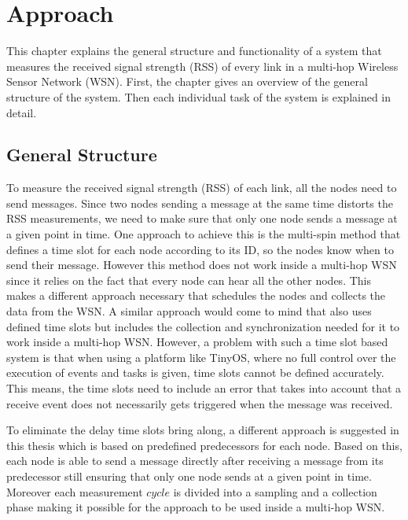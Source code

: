 \chapter{Approach}
\label{chp:apr}
This chapter explains the general structure and functionality of a system that measures the received signal strength (RSS) of every link in a multi-hop Wireless Sensor Network (WSN). First, the chapter gives an overview of the general structure of the system. Then each individual task of the system is explained in detail.

\section{General Structure}
\label{chp:apr_general}

To measure the received signal strength (RSS) of each link, all the nodes need to send messages. Since two nodes sending a message at the same time distorts the RSS measurements, we need to make sure that only one node sends a message at a given point in time. One approach to achieve this is the multi-spin method that defines a time slot for each node according to its ID, so the nodes know when to send their message. However this method does not work inside a multi-hop WSN since it relies on the fact that every node can hear all the other nodes. This makes a different approach necessary that schedules the nodes and collects the data from the WSN. A similar approach would come to mind that also uses defined time slots but includes the collection and synchronization needed for it to work inside a multi-hop WSN. However, a problem with such a time slot based system is that when using a platform like TinyOS, where no full control over the execution of events and tasks is given, time slots cannot be defined accurately. This means, the time slots need to include an error that takes into account that a receive event does not necessarily gets triggered when the message was received.
 
To eliminate the delay time slots bring along, a different approach is suggested in this thesis which is based on predefined predecessors for each node. Based on this, each node is able to send a message directly after receiving a message from its predecessor still ensuring that only one node sends at a given point in time. Moreover each measurement $cycle$ is divided into a sampling and a collection phase making it possible for the approach to be used inside a multi-hop WSN.

